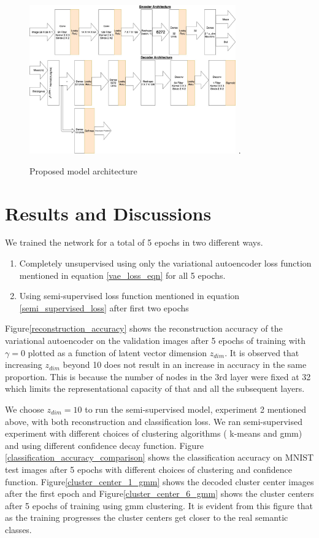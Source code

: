 \documentclass{uai2021} %
\begin{document}
\begin{figure}[!t]
\centering
\includegraphics[width=3.5in]{vae_model_architecture_classification.jpg}
\DeclareGraphicsExtensions.
\caption{Proposed model architecture}
\label{vae_architecture}
\end{figure}

\section{Results and Discussions} \label{results}

We trained the network for a total of 5 epochs in two different ways.
\begin{enumerate}
    \item Completely unsupervised using only the variational autoencoder loss function mentioned in equation \ref{vae_loss_eqn} for all 5 epochs.
    \item Using semi-supervised loss function mentioned in equation \ref{semi_supervised_loss} after first two epochs
\end{enumerate}


Figure\ref{reconstruction_accuracy} shows  the reconstruction accuracy of the variational autoencoder on the validation images after 5 epochs of training with $\gamma = 0$  plotted as a function of latent vector dimension $z_{dim}$.
It is observed that increasing $z_{dim}$ beyond 10 does not result in an increase in accuracy in the same proportion.
This is because the number of nodes in the 3rd layer were fixed at 32 which limits the representational capacity of that and all the subsequent layers.

We choose $z_{dim}=10$ to run the  semi-supervised model, experiment 2 mentioned above,  with both reconstruction and classification loss.
We ran semi-supervised experiment with different choices of clustering algorithms ( k-means and gmm) and using different confidence decay function.
Figure \ref{classification_accuracy_comparison} shows the classification accuracy on MNIST test images after 5 epochs with different choices of clustering and confidence function.
Figure\ref{cluster_center_1_gmm} shows the decoded cluster center images after the first epoch and Figure\ref{cluster_center_6_gmm} shows the cluster centers after 5 epochs of training using gmm clustering.
It is evident from this figure that as the training progresses the cluster centers get closer to the real semantic classes.
\end{document}
